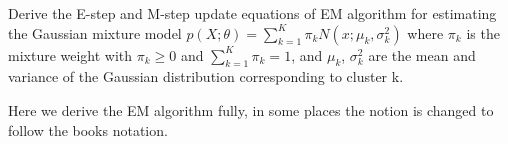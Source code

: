 \documentclass[12pt]{article}
\newenvironment{problem}[2][Problem]{\begin{trivlist}
\item[\hskip \labelsep {\bfseries #1}\hskip \labelsep {\bfseries #2.}]}{\end{trivlist}}
\begin{document}
 

\rhead{\today}
 
 
\begin{problem}{1} %
Derive the E-step and M-step update equations of EM algorithm for estimating the Gaussian mixture model $p(X;\theta) = \sum_{k=1}^{K} \pi_k N(x; \mu_k, \sigma_k^2)$ where $\pi_k$ is the mixture weight with $\pi_k \ge 0$  and  $\sum_{k=1}^{K} \pi_k = 1$, and $\mu_k$, $\sigma^2_k$ are the mean and variance of the Gaussian distribution corresponding to cluster k. 
\end{problem}



Here we derive the EM algorithm fully, in some places the notion is changed to follow the books notation. \\
\end{document}
